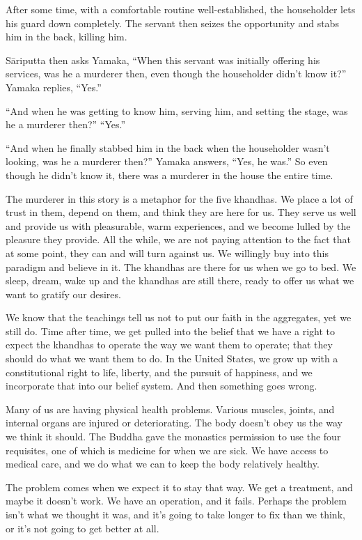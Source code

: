 After some time, with a comfortable routine well-established, the householder lets his guard down completely. The servant then seizes the opportunity and stabs him in the back, killing him.

Sāriputta then asks Yamaka, ``When this servant was initially offering his services, was he a murderer then, even though the householder didn't know it?'' Yamaka replies, ``Yes.''{\parfillskip=0pt \par}

``And when he was getting to know him, serving him, and setting the stage, was he a murderer then?'' ``Yes.''

``And when he finally stabbed him in the back when the householder wasn't looking, was he a murderer then?'' Yamaka answers, ``Yes, he was.'' So even though he didn't know it, there was a murderer in the house the entire time.

The murderer in this story is a metaphor for the five khandhas. We place a lot of trust in them, depend on them, and think they are here for us. They serve us well and provide us with pleasurable, warm experiences, and we become lulled by the pleasure they provide. All the while, we are not paying attention to the fact that at some point, they can and will turn against us. We willingly buy into this paradigm and believe in it. The khandhas are there for us when we go to bed. We sleep, dream, wake up and the khandhas are still there, ready to offer us what we want to gratify our desires.

We know that the teachings tell us not to put our faith in the aggregates, yet we still do. Time after time, we get pulled into the belief that we have a right to expect the khandhas to operate the way we want them to operate; that they should do what we want them to do. In the United States, we grow up with a constitutional right to life, liberty, and the pursuit of happiness, and we incorporate that into our belief system. And then something goes wrong.

Many of us are having physical health problems. Various muscles, joints, and internal organs are injured or deteriorating. The body doesn't obey us the way we think it should. The Buddha gave the monastics permission to use the four requisites, one of which is medicine for when we are sick. We have access to medical care, and we do what we can to keep the body relatively healthy.

The problem comes when we expect it to stay that way. We get a treatment, and maybe it doesn't work. We have an operation, and it fails. Perhaps the problem isn't what we thought it was, and it's going to take longer to fix than \linebreak we think, or it's not going to get better at all.

